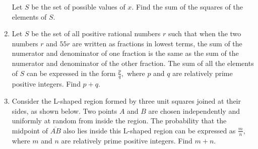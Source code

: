 \documentclass{article}
\begin{document}
\begin{enumerate}[label=\arabic*., itemsep=0.5em]
Let \(S\) be the set of possible values of \(x.\) Find the sum of the squares of the elements of \(S.\)\par \vspace{0.5em}\item Let \(S\) be the set of all positive rational numbers \(r\) such that when the two numbers \(r\) and \(55r\) are written as fractions in lowest terms, the sum of the numerator and denominator of one fraction is the same as the sum of the numerator and denominator of the other fraction. The sum of all the elements of \(S\) can be expressed in the form \(\frac{p}{q},\) where \(p\) and \(q\) are relatively prime positive integers. Find \(p+q.\)\par \vspace{0.5em}\item Consider the L-shaped region formed by three unit squares joined at their sides, as shown below. Two points \(A\) and \(B\) are chosen independently and uniformly at random from inside the region. The probability that the midpoint of \(\overline{AB}\) also lies inside this L-shaped region can be expressed as \(\frac{m}{n},\) where \(m\) and \(n\) are relatively prime positive integers. Find \(m+n.\)


\end{enumerate}
\end{document}
